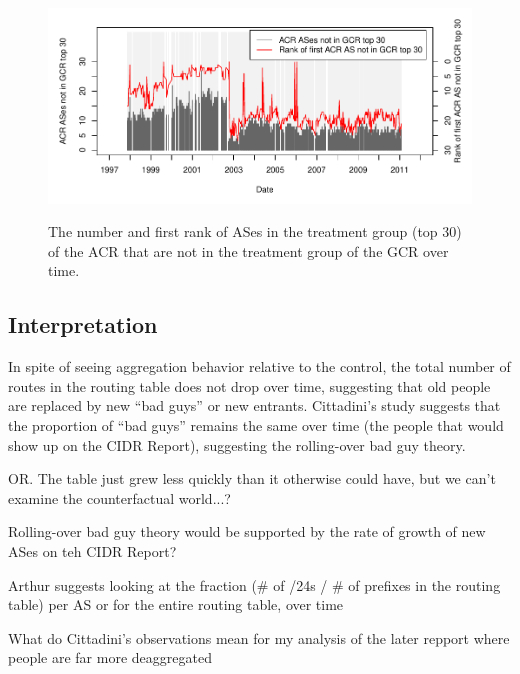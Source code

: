 \begin{figure}
\begin{centering}
    \includegraphics[width=6in]{figures/cidr_report_validity_top30_error.pdf}
    \vspace{-2em}\\
    \caption{The number and first rank of ASes in the treatment group (top 30) of the ACR that are not in the treatment group of the GCR over time.}
\end{centering}
\end{figure}


\subsection{Interpretation}

In spite of seeing aggregation behavior relative to the control, the total number of routes in the routing table does not drop over time, suggesting that old people are replaced by new ``bad guys'' or new entrants. Cittadini's study suggests that the proportion of ``bad guys'' remains the same over time (the people that would show up on the CIDR Report), suggesting the rolling-over bad guy theory.

OR. The table just grew less quickly than it otherwise could have, but we can't examine the counterfactual world...?

Rolling-over bad guy theory would be supported by the rate of growth of new ASes on teh CIDR Report?

Arthur suggests looking at the fraction (\# of /24s / \# of prefixes in the routing table) per AS or for the entire routing table, over time

What do Cittadini's observations mean for my analysis of the later repport where people are far more deaggregated

